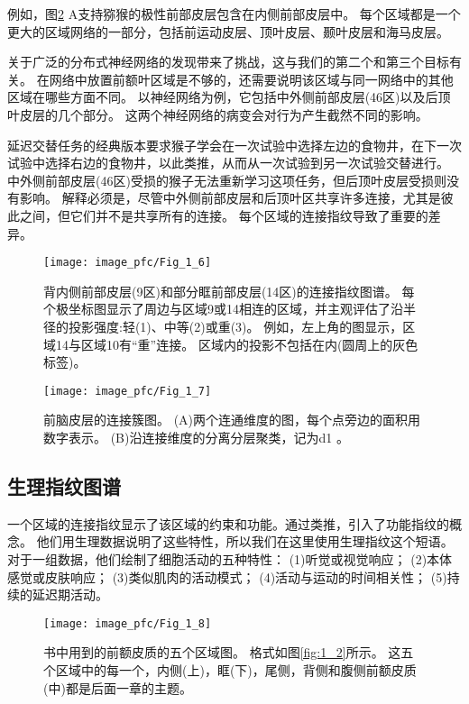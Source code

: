 \par
例如，图\ref{fig:1_7} A支持猕猴的极性前部皮层包含在内侧前部皮层中。
每个区域都是一个更大的区域网络的一部分，包括前运动皮层、顶叶皮层、颞叶皮层和海马皮层。

\par
关于广泛的分布式神经网络的发现带来了挑战，这与我们的第二个和第三个目标有关。
在网络中放置前额叶区域是不够的，还需要说明该区域与同一网络中的其他区域在哪些方面不同。
以神经网络为例，它包括中外侧前部皮层(46区)以及后顶叶皮层的几个部分。
这两个神经网络的病变会对行为产生截然不同的影响。

\par
延迟交替任务的经典版本要求猴子学会在一次试验中选择左边的食物井，在下一次试验中选择右边的食物井，以此类推，从而从一次试验到另一次试验交替进行。
中外侧前部皮层(46区)受损的猴子无法重新学习这项任务\cite{butters1969retention}，但后顶叶皮层受损则没有影响\cite{ettlinger1966tactile}。
解释必须是，尽管中外侧前部皮层和后顶叶区共享许多连接，尤其是彼此之间，但它们并不是共享所有的连接。
每个区域的连接指纹导致了重要的差异。


\begin{figure}[!htb]
	\centering
	\texttt{[image: image\_pfc/Fig\_1\_6]}
	\caption{背内侧前部皮层(9区)和部分眶前部皮层(14区)的连接指纹图谱。
		每个极坐标图显示了周边与区域9或14相连的区域，并主观评估了沿半径的投影强度:轻(1)、中等(2)或重(3)。
		例如，左上角的图显示，区域14与区域10有“重”连接。
		区域内的投影不包括在内(圆周上的灰色标签)\cite{2002Dorsal}。 \label{fig:1_6}}
\end{figure}

\begin{figure}[!htb]
	\centering
	\texttt{[image: image\_pfc/Fig\_1\_7]}
	\caption{前脑皮层的连接簇图。
		(A)两个连通维度的图，每个点旁边的面积用数字表示。
		(B)沿连接维度的分离分层聚类，记为d1 \cite{2002Dorsal}。\label{fig:1_7}}
\end{figure}


\subsection{生理指纹图谱}
一个区域的连接指纹显示了该区域的约束和功能。通过类推，引入了功能指纹的概念\cite{2002Dorsal}。
他们用生理数据说明了这些特性，所以我们在这里使用生理指纹这个短语。
对于一组数据，他们绘制了细胞活动的五种特性： 
(1)听觉或视觉响应；
(2)本体感觉或皮肤响应；
(3)类似肌肉的活动模式；
(4)活动与运动的时间相关性；
(5)持续的延迟期活动。

\begin{figure}[!htb]
	\centering
	\texttt{[image: image\_pfc/Fig\_1\_8]}
	\caption{书中用到的前额皮质的五个区域图。
		格式如图\ref{fig:1_2}所示。
		这五个区域中的每一个，内侧(上)，眶(下)，尾侧，背侧和腹侧前额皮质(中)都是后面一章的主题。\label{fig:1_8}}
\end{figure}

